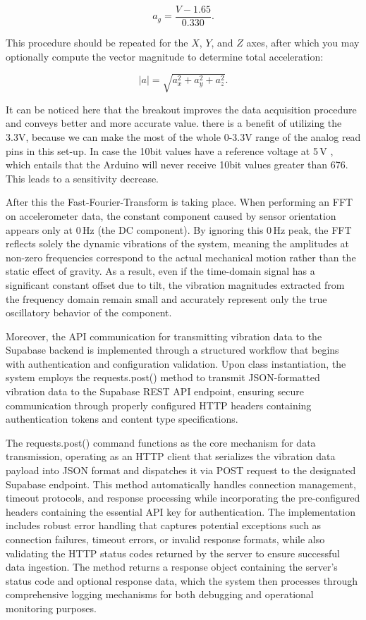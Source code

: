 {	\[
	a_g = \frac{V - 1.65}{0.330}.
	\]
	
	This procedure should be repeated for the \(X\), \(Y\), and \(Z\) axes, after which you may optionally compute 
	the vector magnitude to determine total acceleration:
	
	\[
	|a| = \sqrt{a_x^2 + a_y^2 + a_z^2}.
	\]
	
	It can be noticed here that the breakout improves the data acquisition procedure and conveys better and more accurate value.  there is a benefit of utilizing the 3.3V, because we can make the most of the whole 0-3.3V range of the analog read pins in this set-up. In case the 10bit values have a reference voltage at 5\,V , which entails that the Arduino will never receive 10bit values greater than 676. This leads to a sensitivity decrease. 
	
	After this the Fast-Fourier-Transform is taking place. When performing an FFT on accelerometer data, the constant component caused by sensor orientation appears only at 0 Hz (the DC component). By ignoring this 0 Hz peak, the FFT reflects solely the dynamic vibrations of the system, meaning the amplitudes at non-zero frequencies correspond to the actual mechanical motion rather than the static effect of gravity. As a result, even if the time-domain signal has a significant constant offset due to tilt, the vibration magnitudes extracted from the frequency domain remain small and accurately represent only the true oscillatory behavior of the component.
	
	Moreover, the API communication for transmitting vibration data to the Supabase backend is implemented through a structured workflow that begins with authentication and configuration validation. Upon class instantiation, the system employs the requests.post() method to transmit JSON-formatted vibration data to the Supabase REST API endpoint, ensuring secure communication through properly configured HTTP headers containing authentication tokens and content type specifications.
	
	The requests.post() command functions as the core mechanism for data transmission, operating as an HTTP client that serializes the vibration data payload into JSON format and dispatches it via POST request to the designated Supabase endpoint. This method automatically handles connection management, timeout protocols, and response processing while incorporating the pre-configured headers containing the essential API key for authentication. The implementation includes robust error handling that captures potential exceptions such as connection failures, timeout errors, or invalid response formats, while also validating the HTTP status codes returned by the server to ensure successful data ingestion. The method returns a response object containing the server's status code and optional response data, which the system then processes through comprehensive logging mechanisms for both debugging and operational monitoring purposes.

}
